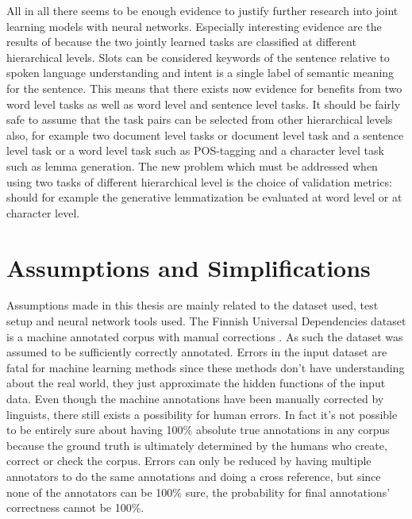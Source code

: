 \documentclass[12pt,a4paper,english
]{tutthesis}
\begin{document}
All in all there seems to be enough evidence to justify further research into joint learning models with neural networks. Especially interesting evidence are the results of \cite{Liu2016a} because the two jointly learned tasks are classified at different hierarchical levels. Slots can be considered keywords of the sentence relative to spoken language understanding and intent is a single label of semantic meaning for the sentence. This means that there exists now evidence for benefits from two word level tasks as well as word level and sentence level tasks. It should be fairly safe to assume that the task pairs can be selected from other hierarchical levels also, for example two document level tasks or document level task and a sentence level task or a word level task such as POS-tagging and a character level task such as lemma generation. The new problem which must be addressed when using two tasks of different hierarchical level is the choice of validation metrics: should for example the generative lemmatization be evaluated at word level or at character level.

\section{Assumptions and Simplifications}
Assumptions made in this thesis are mainly related to the dataset used, test setup and neural network tools used. The Finnish Universal Dependencies dataset is a machine annotated corpus with manual corrections \cite{Haverinen2014}. As such the dataset was assumed to be sufficiently correctly annotated. Errors in the input dataset are fatal for machine learning methods since these methods don't have understanding about the real world, they just approximate the hidden functions of the input data. Even though the machine annotations have been manually corrected by linguists, there still exists a possibility for human errors. In fact it's not possible to be entirely sure about having 100\% absolute true annotations in any corpus because the ground truth is ultimately determined by the humans who create, correct or check the corpus. Errors can only be reduced by having multiple annotators to do the same annotations and doing a cross reference, but since none of the annotators can be 100\% sure, the probability for final annotations' correctness cannot be 100\%.
\end{document}
